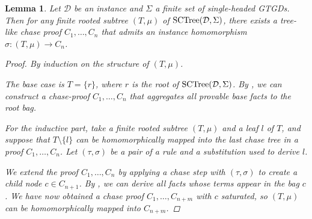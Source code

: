 \documentclass[12pt]{report}
\theoremstyle{plain}
\newtheorem{lemma}[theorem]{Lemma}
\theoremstyle{definition}
\newcommand{\SCTree}[2]{\ensuremath{\normalfont{\textrm{SCTree}}\!\left( #1, #2 \right)}}
\begin{document}
\begin{lemma}
\label{lemma:sctree-subtree-embeds-into-a-chase-proof}
  Let $\mathcal{D}$ be an instance and $\Sigma$ a finite set of single-headed GTGDs. Then for any finite rooted subtree $(T, \mu)$ of $\SCTree{\mathcal{D}}{\Sigma}$, there exists a tree-like chase proof $C_1, \ldots, C_n$ that admits an instance homomorphism $\sigma: (T, \mu) \rightarrow C_n$.
  \begin{proof}
    By induction on the structure of $(T, \mu)$.

    The base case is $T = \{r\}$, where $r$ is the root of $\SCTree{\mathcal{D}}{\Sigma}$. By , we can construct a chase-proof $C_1, \ldots, C_n$ that aggregates all provable base facts to the root bag.

    For the inductive part, take a finite rooted subtree $(T, \mu)$ and a leaf $l$ of $T$, and suppose that $T \setminus \{l\}$ can be homomorphically mapped into the last chase tree in a proof $C_1, \ldots, C_n$. Let $(\tau, \sigma)$ be a pair of a rule and a substitution used to derive $l$.
    
    We extend the proof $C_1, \ldots, C_n$ by applying a chase step with $(\tau, \sigma)$ to create a child node $c \in C_{n+1}$. By , we can derive all facts whose terms appear in the bag $c$. We have now obtained a chase proof $C_1, \ldots, C_{n+m}$ with $c$ saturated, so $(T, \mu)$ can be homomorphically mapped into $C_{n+m}$.
  \end{proof}
\end{lemma}
\end{document}
